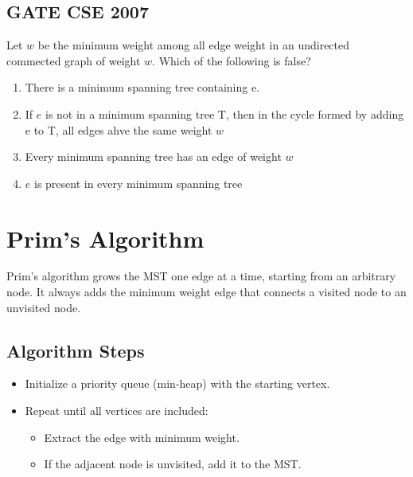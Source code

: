 \documentclass[a4paper,14pt]{extarticle}
\begin{document}
\subsection{GATE CSE 2007}
Let $w$ be the minimum weight among all edge weight in an 
undirected commected graph of weight $w$. Which of the following is false?

\begin{enumerate}[label=(\alph*)]
    \item There is a minimum spanning tree containing e.
    \item If $e$ is not in a minimum spanning tree T, then in the cycle formed by adding e to T, all edges ahve the same weight $w$
    \item Every minimum spanning tree has an edge of weight $w$
    \item $e$ is present in every minimum spanning tree
\end{enumerate}

\newpage
\section{Prim's Algorithm}

Prim's\cite{prim1957} algorithm grows the MST one edge at a time, starting from an arbitrary node. 
It always adds the minimum weight edge that connects a visited node to an unvisited node.



\subsection{Algorithm Steps}
\begin{itemize}
    \item Initialize a priority queue (min-heap) with the starting vertex.
    \item Repeat until all vertices are included:
    \begin{itemize}
        \item Extract the edge with minimum weight.
        \item If the adjacent node is unvisited, add it to the MST.
    \end{itemize}
\end{itemize}

\end{document}
